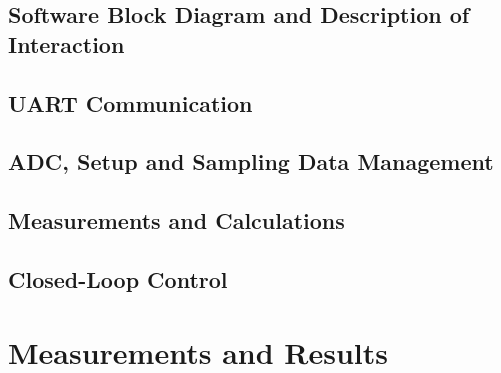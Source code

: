 \subsection{Software Block Diagram and Description of Interaction}
\subsection{UART Communication}
\subsection{ADC, Setup and Sampling Data Management}
\subsection{Measurements and Calculations}
\subsection{Closed-Loop Control}


\section{Measurements and Results}


